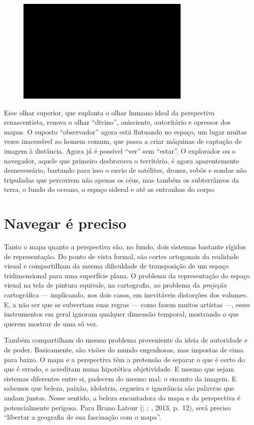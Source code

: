 \begin{figure}[!ht]

\centering
 \includegraphics[width=85mm]{./imgs/im1.jpg}
\caption{\tiny{}}

\end{figure}

Esse olhar superior, que suplanta o olhar humano ideal da perspectiva
renascentista, renova o olhar ``divino'', onisciente, autoritário e
opressor dos mapas. O suposto ``observador'' agora está flutuando no
espaço, um lugar muitas vezes inacessível ao homem comum, que passa a
criar máquinas de captação de imagem à distância. Agora já é possível
``ver'' sem ``estar''. O explorador ou o navegador, aquele que primeiro
desbravava o território, é agora aparentemente desnecessário, bastando
para isso o envio de satélites, drones, robôs e sondas não tripuladas
que percorrem não apenas os céus, mas também os subterrâneos da terra, o
fundo do oceano, o espaço sideral e até as entranhas do corpo.

\chapter{Navegar é preciso}

Tanto o mapa quanto a perspectiva são, no fundo, dois sistemas bastante
rígidos de representação. Do ponto de vista formal, são cortes
ortogonais da realidade visual e compartilham da mesma dificuldade de
transposição de um espaço tridimensional para uma superfície plana. O
problema da representação do espaço visual  na tela de pintura 
equivale, na cartografia, ao problema da \emph{projeção} cartográfica
--- implicando, nos dois casos, em inevitáveis distorções dos volumes.
E, a não ser que se subvertam suas regras --- como fazem muitos artistas
---, esses instrumentos em geral ignoram qualquer dimensão temporal,
mostrando o que querem mostrar de uma só vez.

Também compartilham do mesmo problema proveniente da ideia de autoridade
e de poder. Basicamente, são visões do mundo engenhosas, mas impostas de
cima para baixo. O mapa e a perspectiva têm a pretensão de separar o que
é certo do que é errado, e acreditam numa hipotética objetividade. E
mesmo que sejam sistemas diferentes entre si, padecem do mesmo mal: o
encanto da imagem. E sabemos que beleza, paixão, idolatria, cegueira e
ignorância são palavras que andam juntas. Nesse sentido, a beleza
encantadora do mapa e da perspectiva é potencialmente perigosa. Para
Bruno Latour (; ; , 2013, p.~12), será
preciso ``libertar a geografia de sua fascinação com o mapa''.

